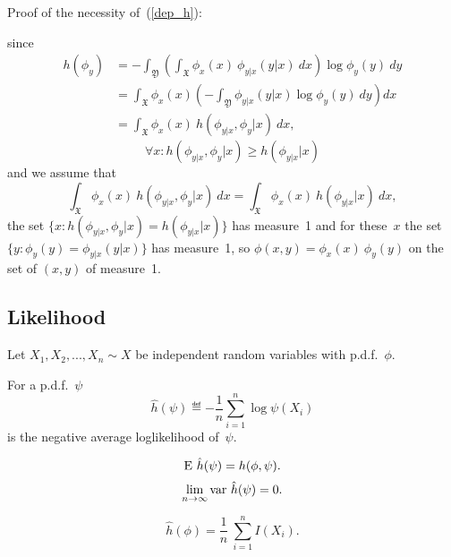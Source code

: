\documentclass[10pt,a4paper]{article}
\theoremstyle{plain} \newtheorem{Lem}{Lemma}
\begin{document}
Proof of the necessity of~(\ref{dep_h}): \par
since
\begin{equation}
\begin{split}
 h(\phi_y) &= - \int_{\mathfrak Y} \left(\int_{\mathfrak X} \phi_x(x) \ \phi_{y|x}(y|x) \ dx \right) \log \phi_y(y) \ dy \\
           &= \int_{\mathfrak X} \phi_x(x) \left( - \int_{\mathfrak Y} \phi_{y|x}(y|x) \log \phi_y(y) \ dy \right) dx \\
           &= \int_{\mathfrak X} \phi_x(x) \ h(\phi_{y|x}, \phi_y|x) \ dx,
\end{split}
\end{equation}
$$ \forall x :  h(\phi_{y|x}, \phi_y|x) \ge h(\phi_{y|x}|x) $$
and we assume that
$$ \int_{\mathfrak X} \phi_x(x) \ h(\phi_{y|x}, \phi_y|x) \ dx = \int_{\mathfrak X} \phi_x(x) \ h(\phi_{y|x}|x) \ dx, $$
the set $\{x: h(\phi_{y|x}, \phi_y|x) = h(\phi_{y|x}|x) \}$
has measure~1 and for these~$x$ the set $\{y: \phi_y(y) = \phi_{y|x}(y|x)\}$ has measure~1,
so $\phi(x,y) = \phi_x(x) \ \phi_y(y)$ on the set of $(x,y)$ of measure~1.
\QED


\subsection{Likelihood}
Let $X_1, X_2, ..., X_n \sim X$ be independent random variables with p.d.f.~$\phi$.

For a p.d.f.~$\psi$ 
$$ \hat h(\psi) \eqdef - \frac 1 n \sum_{i=1}^n \log \psi(X_i) $$
is the negative average loglikelihood of~$\psi$.

$$ \mathrm E \  \hat h(\psi) = h(\phi,\psi). $$
$$ \lim_{n \to \infty} \mathrm {var} \  \hat h(\psi) = 0. $$

$$ \hat h (\phi) = \frac 1 n \ \sum_{i=1}^n I(X_i). $$
\end{document}
